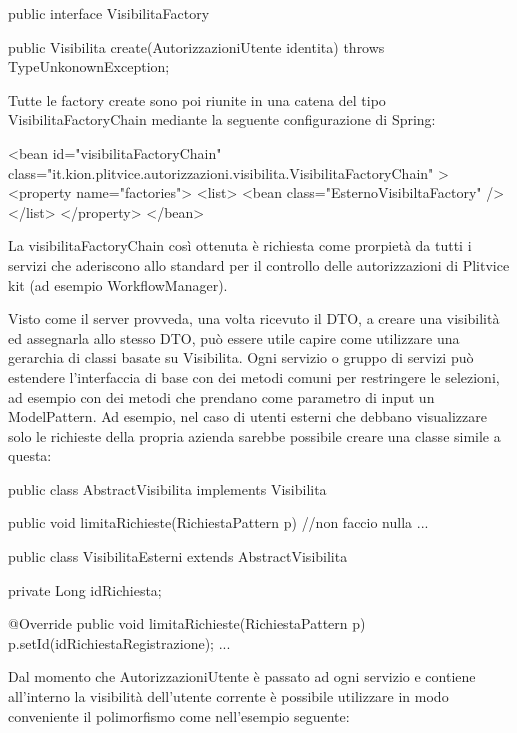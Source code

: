 \begin{java}
public interface VisibilitaFactory { 
  
  public Visibilita create(AutorizzazioniUtente identita) throws TypeUnkonownException;

} 
\end{java}


Tutte le factory create sono poi riunite in una catena del tipo VisibilitaFactoryChain mediante la seguente configurazione di Spring:

\begin{xml}
    <bean id="visibilitaFactoryChain" class="it.kion.plitvice.autorizzazioni.visibilita.VisibilitaFactoryChain" >
      <property name="factories">
        <list>
          <bean class="EsternoVisibiltaFactory"  />
        </list>
      </property>
    </bean> 
\end{xml}

La  visibilitaFactoryChain così ottenuta è richiesta come prorpietà da tutti i servizi che aderiscono allo standard per il controllo delle autorizzazioni di Plitvice kit (ad esempio WorkflowManager).

Visto come il server provveda, una volta ricevuto il DTO, a creare una visibilità ed assegnarla allo stesso DTO,  può essere utile capire come utilizzare una gerarchia di classi basate su Visibilita. Ogni servizio o gruppo di servizi può estendere  l'interfaccia di base con dei metodi comuni per restringere le selezioni, ad esempio con dei metodi che prendano come parametro di input un ModelPattern. Ad esempio, nel caso di utenti esterni  che debbano visualizzare solo le richieste della propria azienda sarebbe possibile creare una classe simile a questa:

\begin{java}
public class AbstractVisibilita implements Visibilita {

  public void limitaRichieste(RichiestaPattern p) {
    //non faccio nulla
  }
      ...
}

public class VisibilitaEsterni extends AbstractVisibilita {

  private Long idRichiesta;
  
  @Override
  public void limitaRichieste(RichiestaPattern p) {
    p.setId(idRichiestaRegistrazione);
  }
  ...
}

\end{java}


Dal momento che AutorizzazioniUtente è passato ad ogni servizio e contiene all'interno la visibilità dell'utente corrente  è possibile utilizzare in modo conveniente il polimorfismo come nell'esempio seguente:

